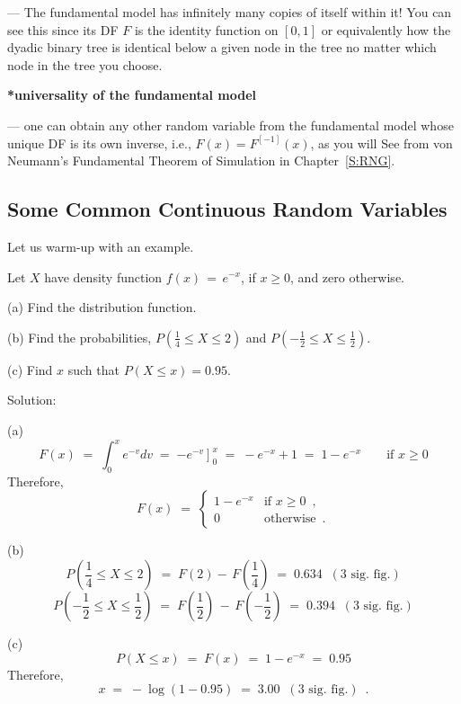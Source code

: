 --- The fundamental model has infinitely many copies of itself within it! You can see this since its DF $F$ is the identity function on $[0,1]$ or equivalently how the dyadic binary tree is identical below a given node in the tree no matter which node in the tree you choose.


{\bf **universality of the fundamental model}

--- one can obtain any other random variable from the fundamental model whose unique DF is its own inverse, i.e., $F(x)=F^{[-1]}(x)$, as you will See from von Neumann's Fundamental Theorem of Simulation in Chapter~\ref{S:RNG}.

\subsection{Some Common Continuous Random Variables}\label{S:CommonContRV}

Let us warm-up with an example.


\begin{example}\label{EgPdfeToTheminusx}
{Let $X$ have  density function $f(x)\,=\,e^{-x}$, if $x\geq0$,  and
  zero otherwise.
  \be
\item[(a)]Find the distribution function.
\item[(b)] Find the probabilities, $P(\frac{1}{4}\leq X \leq 2)$ and
  $P\left(-\frac{1}{2}\leq X\leq \frac{1}{2}\right)$.
\item[(c)]Find $x$ such that $P(X\leq x) =0.95$.
\ee
}

Solution:\\[4pt]
{\be
\item[(a)] 
$$
F(x)\;=\;\int_0^{x}e^{-v}dv
\;=\;\left.-e^{-v}\right]^x_0 
\;=\;-e^{-x}+1\;=\;1-e^{-x}\qquad \textrm{if }x \geq 0
$$
Therefore, 
$$
F(x)\;=\;
\begin{cases}
1-e^{-x}& \textrm{if }x \geq 0\enspace , \\
0&\textrm{otherwise}\enspace.
\end{cases}
$$
\item[(b)]
$$
P\left(\frac{1}{4}\leq X\leq 2\right) 
\;=\;F(2)-\,F\left(\frac{1}{4}\right)
\;=\;0.634\;\;(\text{3 sig. fig.})
$$
$$
P\left(-\frac{1}{2}\leq X\leq \frac{1}{2}\right) 
\;=\;
F\left(\frac{1}{2}\right)\,-\,F\left(-\frac{1}{2}\right)
\;=\;0.394 \;\;(\text{3 sig. fig.})
$$
\item[(c)] $$P(X\leq x)\;=\;F(x)\;=\;1-e^{-x}\;=\;0.95$$
Therefore, $$x\;=\;-\log(1-0.95)\;=\;3.00\;\;(\text{3 sig. fig.})\enspace.$$
\ee
}
\end{example}


